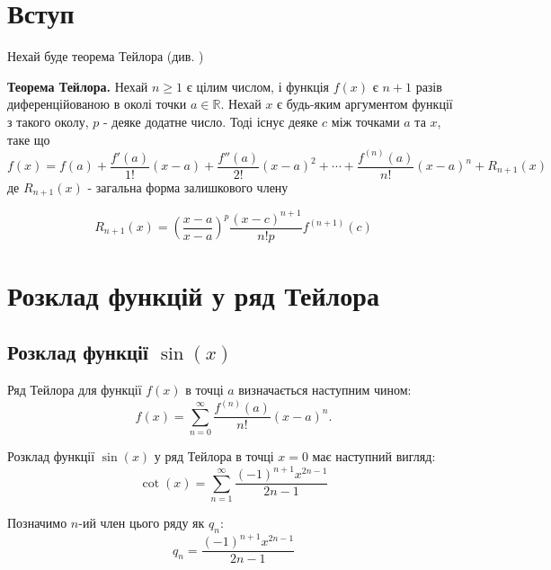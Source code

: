 



	
	\section{Вступ}
	Нехай буде теорема Тейлора (див. \cite{weisstein})
	\begin{theorem}\label{ttt1}
		\textbf{Теорема Тейлора.} Нехай $n\geq1$ є цілим числом, і функція $f(x)$ є $n+1$ разів диференційованою в околі точки $a\in\mathbb{R}$. Нехай $x$ є будь-яким аргументом функції з такого околу, $p$ - деяке додатне число. Тоді існує деяке $c$ між точками $a$ та $x$, таке що
		\begin{equation}\label{mvm}
			f(x)=f(a)+\frac{f'(a)}{1!}(x-a)+\frac{f''(a)}{2!}(x-a)^2+\cdots+\frac{f^{(n)}(a)}{n!}(x-a)^n+R_{n+1}(x)
		\end{equation}
		де $R_{n+1}(x)$ - загальна форма залишкового члену
		
		\begin{equation}\label{xcxxxs}
			R_{n+1}(x)=\left(\frac{x-a}{x-a}\right)^p \frac{(x-c)^{n+1}}{n!p}f^{(n+1)}(c)
		\end{equation}

		\end{theorem}
	\section{Розклад функцій у ряд Тейлора}
	
	\subsection{Розклад функції \( \sin(x) \)}
	
	\begin{definition}
		Ряд Тейлора для функції \( f(x) \) в точці \( a \) визначається наступним чином:
		\[
		f(x) = \sum_{n=0}^{\infty} \frac{f^{(n)}(a)}{n!}(x-a)^n.
		\]
	\end{definition}
	
	\begin{theorem}
		Розклад функції \( \sin(x) \) у ряд Тейлора в точці \( x = 0 \) має наступний вигляд:
		\begin{equation} \label{eq:cot_general}
			\cot(x) = \sum_{n=1}^{\infty} \frac{(-1)^{n+1} x^{2n-1}}{2n-1} 
		\end{equation}
	\end{theorem}
	
	\begin{definition}
		Позначимо \( n \)-ий член цього ряду як \( q_n \):
		\begin{equation} \label{eq:q_sum_n}
			q_n = \frac{(-1)^{n+1} x^{2n-1}}{2n-1}
		\end{equation}
	\end{definition}
	
